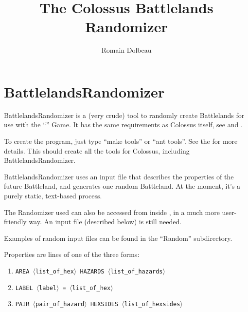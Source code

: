\documentclass{article}
\begin{document}

\title{The Colossus Battlelands Randomizer}

\author{Romain Dolbeau}

\maketitle

\section{BattlelandsRandomizer}

BattlelandsRandomizer is a (very crude) tool to randomly
create Battlelands for use with the
``'' Game.
It has the same requirements as Colossus itself, see
and
.

To create the program, just type ``make tools'' or ``ant tools''.
See the
for more details.
This should create all the tools for Colossus, including
BattlelandsRandomizer.

BattlelandsRandomizer uses an input file that describes
the properties of the future Battleland, and generates
one random Battleland. At the moment, it's a purely
static, text-based process.

The Randomizer used can also be accessed from inside
,
in a much more user-friendly way. An input file (described below) is
still needed.

Examples of random input files can be found in the
``Random'' subdirectory.

Properties are lines of one of the three forms:

\begin{enumerate}

\item \texttt{AREA $\langle$list\_of\_hex$\rangle$ HAZARDS $\langle$list\_of\_hazards$\rangle$}
\item \texttt{LABEL $\langle$label$\rangle$ = $\langle$list\_of\_hex$\rangle$}
\item \texttt{PAIR $\langle$pair\_of\_hazard$\rangle$ HEXSIDES $\langle$list\_of\_hexsides$\rangle$}

\end{enumerate}
\end{document}
